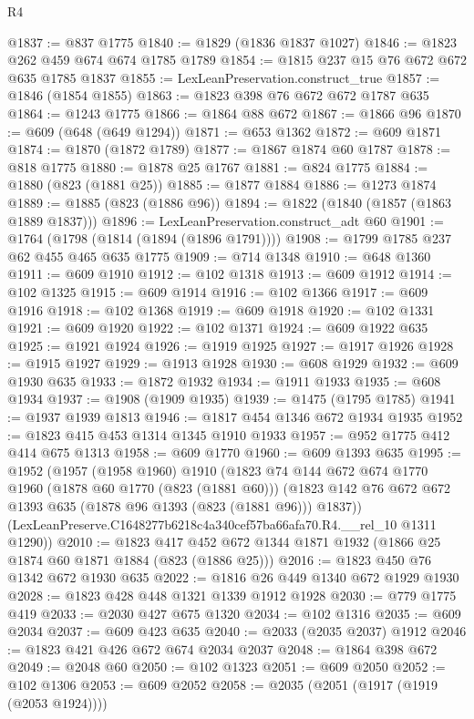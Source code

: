 \begin{lexlean}{R4}
\begin{coremodule}
@1837 := @837 @1775
@1840 := @1829 (@1836 @1837 @1027)
@1846 := @1823 @262 @459 @674 @674 @1785 @1789
@1854 := @1815 @237 @15 @76 @672 @672 @635 @1785 @1837
@1855 := LexLeanPreservation.construct_true
@1857 := @1846 (@1854 @1855)
@1863 := @1823 @398 @76 @672 @672 @1787 @635
@1864 := @1243 @1775
@1866 := @1864 @88 @672
@1867 := @1866 @96
@1870 := @609 (@648 (@649 @1294))
@1871 := @653 @1362
@1872 := @609 @1871
@1874 := @1870 (@1872 @1789)
@1877 := @1867 @1874 @60 @1787
@1878 := @818 @1775
@1880 := @1878 @25 @1767
@1881 := @824 @1775
@1884 := @1880 (@823 (@1881 @25))
@1885 := @1877 @1884
@1886 := @1273 @1874
@1889 := @1885 (@823 (@1886 @96))
@1894 := @1822 (@1840 (@1857 (@1863 @1889 @1837)))
@1896 := LexLeanPreservation.construct_adt @60
@1901 := @1764 (@1798 (@1814 (@1894 (@1896 @1791))))
@1908 := @1799 @1785 @237 @62 @455 @465 @635 @1775
@1909 := @714 @1348
@1910 := @648 @1360
@1911 := @609 @1910
@1912 := @102 @1318
@1913 := @609 @1912
@1914 := @102 @1325
@1915 := @609 @1914
@1916 := @102 @1366
@1917 := @609 @1916
@1918 := @102 @1368
@1919 := @609 @1918
@1920 := @102 @1331
@1921 := @609 @1920
@1922 := @102 @1371
@1924 := @609 @1922 @635
@1925 := @1921 @1924
@1926 := @1919 @1925
@1927 := @1917 @1926
@1928 := @1915 @1927
@1929 := @1913 @1928
@1930 := @608 @1929
@1932 := @609 @1930 @635
@1933 := @1872 @1932
@1934 := @1911 @1933
@1935 := @608 @1934
@1937 := @1908 (@1909 @1935)
@1939 := @1475 (@1795 @1785)
@1941 := @1937 @1939 @1813
@1946 := @1817 @454 @1346 @672 @1934 @1935
@1952 := @1823 @415 @453 @1314 @1345 @1910 @1933
@1957 := @952 @1775 @412 @414 @675 @1313
@1958 := @609 @1770
@1960 := @609 @1393 @635
@1995 := @1952
    (@1957
      (@1958 @1960)
      @1910
      (@1823
        @74
        @144
        @672
        @674
        @1770
        @1960
        (@1878 @60 @1770 (@823 (@1881 @60)))
        (@1823 @142 @76 @672 @672 @1393 @635 (@1878 @96 @1393 (@823 (@1881 @96))) @1837))
      (LexLeanPreserve.C1648277b6218c4a340cef57ba66afa70.R4.__rel_10 @1311 @1290))
@2010 := @1823 @417 @452 @672 @1344 @1871 @1932 (@1866 @25 @1874 @60 @1871 @1884 (@823 (@1886 @25)))
@2016 := @1823 @450 @76 @1342 @672 @1930 @635
@2022 := @1816 @26 @449 @1340 @672 @1929 @1930
@2028 := @1823 @428 @448 @1321 @1339 @1912 @1928
@2030 := @779 @1775 @419
@2033 := @2030 @427 @675 @1320
@2034 := @102 @1316
@2035 := @609 @2034
@2037 := @609 @423 @635
@2040 := @2033 (@2035 @2037) @1912
@2046 := @1823 @421 @426 @672 @674 @2034 @2037
@2048 := @1864 @398 @672
@2049 := @2048 @60
@2050 := @102 @1323
@2051 := @609 @2050
@2052 := @102 @1306
@2053 := @609 @2052
@2058 := @2035 (@2051 (@1917 (@1919 (@2053 @1924))))

\end{coremodule}
\end{lexlean}
